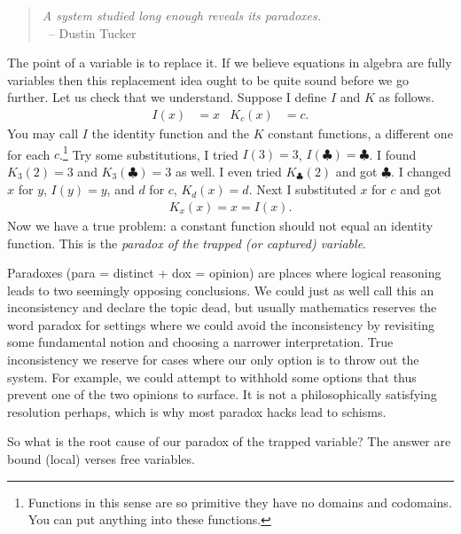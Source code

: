 \begin{quote}
\emph{A system studied long enough reveals its paradoxes.}\\
~\hfill-- Dustin Tucker
\end{quote}
The point of a variable is to replace it.  If we believe equations 
in algebra are fully variables then this replacement idea ought
to be quite sound before we go further.  Let us check that we understand.
Suppose I define $I$ and $K$ as follows.
\begin{align*}
    I(x) & = x & 
    K_c(x) & = c.
\end{align*}
You may call $I$ the identity function and the $K$ constant functions,
a different one for each $c$.\footnote{Functions in this sense are so primitive 
they have no domains and codomains.  You can put anything into these functions.}
Try some substitutions, I tried $I(3)=3$, $I(\clubsuit)=\clubsuit$.
I found $K_3(2)=3$ and $K_3(\clubsuit)=3$ as well.  I even tried 
$K_{\clubsuit}(2)$ and got $\clubsuit$.  I changed $x$ for $y$, 
$I(y)=y$, and $d$ for $c$, $K_d(x)=d$. Next I substituted $x$ for $c$ and got
\begin{align*}
    K_x(x)=x=I(x).
\end{align*}
Now we have a true problem: a constant function should not equal 
an identity function.  This is the \emph{paradox of the trapped (or captured) variable}.

Paradoxes (para = distinct + dox = opinion) are places where logical 
reasoning leads to two seemingly opposing conclusions.  We could just 
as well call this an inconsistency and declare the topic dead, but usually 
mathematics reserves the word paradox for settings where we could avoid the 
inconsistency by revisiting some fundamental notion and choosing a narrower 
interpretation.  True inconsistency we reserve for cases where our only option 
is to throw out the system.  For example, we could attempt to withhold some options that thus prevent one of the two opinions to surface.  It is not a philosophically satisfying resolution perhaps,
which is why most paradox hacks lead to schisms. 

So what is the root cause of our paradox of the trapped variable?
The answer are bound (local) verses free variables. 
